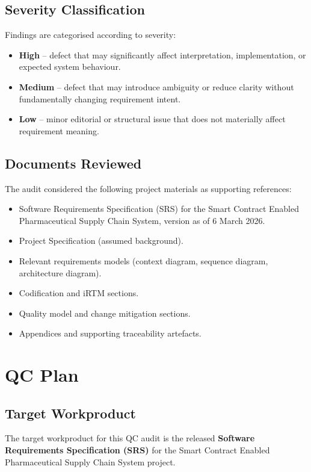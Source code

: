 \documentclass[11pt,a4paper]{article}
\begin{document}
\subsection{Severity Classification}
Findings are categorised according to severity:
\begin{itemize}[leftmargin=*]
\item \textbf{High} -- defect that may significantly affect interpretation, implementation, or expected system behaviour.
\item \textbf{Medium} -- defect that may introduce ambiguity or reduce clarity without fundamentally changing requirement intent.
\item \textbf{Low} -- minor editorial or structural issue that does not materially affect requirement meaning.
\end{itemize}

\subsection{Documents Reviewed}
The audit considered the following project materials as supporting references:
\begin{itemize}[leftmargin=*]
\item Software Requirements Specification (SRS) for the Smart Contract Enabled Pharmaceutical Supply Chain System, version as of 6 March 2026.
\item Project Specification (assumed background).
\item Relevant requirements models (context diagram, sequence diagram, architecture diagram).
\item Codification and iRTM sections.
\item Quality model and change mitigation sections.
\item Appendices and supporting traceability artefacts.
\end{itemize}

\section{QC Plan}

\subsection{Target Workproduct}
The target workproduct for this QC audit is the released \textbf{Software Requirements Specification (SRS)} for the Smart Contract Enabled Pharmaceutical Supply Chain System project.
\end{document}
